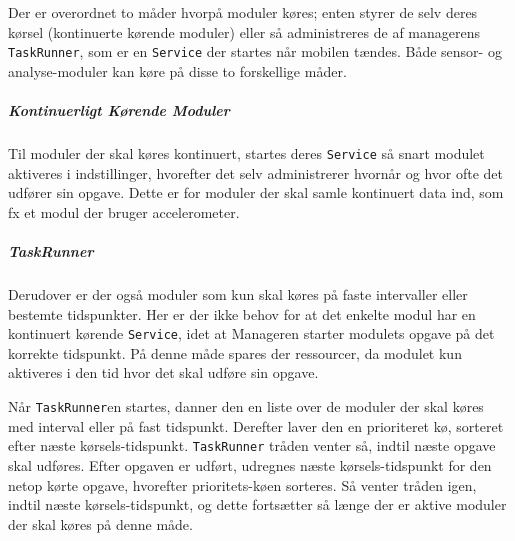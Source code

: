 Der er overordnet to måder hvorpå moduler køres; enten styrer de selv deres kørsel (kontinuerte kørende moduler) eller så administreres de af managerens \texttt{TaskRunner}, som er en \texttt{Service} der startes når mobilen tændes.
Både sensor- og analyse-moduler kan køre på disse to forskellige måder.

\subparagraph{Kontinuerligt Kørende Moduler}
Til moduler der skal køres kontinuert, startes deres \texttt{Service} så snart modulet aktiveres i indstillinger, hvorefter det selv administrerer hvornår og hvor ofte det udfører sin opgave.
Dette er for moduler der skal samle kontinuert data ind, som fx et modul der bruger accelerometer.

\subparagraph{TaskRunner}
Derudover er der også moduler som kun skal køres på faste intervaller eller bestemte tidspunkter.
Her er der ikke behov for at det enkelte modul har en kontinuert kørende \texttt{Service}, idet at Manageren starter modulets opgave på det korrekte tidspunkt.
På denne måde spares der ressourcer, da modulet kun aktiveres i den tid hvor det skal udføre sin opgave. 

Når \texttt{TaskRunner}en startes, danner den en liste over de moduler der skal køres med interval eller på fast tidspunkt.
Derefter laver den en prioriteret kø, sorteret efter næste kørsels-tidspunkt.
\texttt{TaskRunner} tråden venter så, indtil næste opgave skal udføres.
Efter opgaven er udført, udregnes næste kørsels-tidspunkt for den netop kørte opgave, hvorefter prioritets-køen sorteres.
Så venter tråden igen, indtil næste kørsels-tidspunkt, og dette fortsætter så længe der er aktive moduler der skal køres på denne måde.
